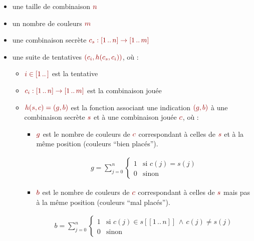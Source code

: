 \documentclass[a4paper]{article}
\newcommand{\isep}{\,..\,}
\renewcommand{\(}{\begin{math}\color{brick}}
\renewcommand{\)}{\end{math}}
\newcommand{\blockmath}[1]{{\color{brick}\begin{align*}#1\end{align*}}}
\newcommand{\lnd}{\,\land\,}
\begin{document}
\begin{itemize}
  
\item une taille de combinaison \(n\)
  
\item un nombre de couleurs \(m\)
  
\item une combinaison secrète \(c_s : [1 \isep n] \rightarrow [1 \isep m]\)
  
\item une suite de tentatives \((c_i, h(c_s,c_i))\), où :
  
  \begin{itemize}
    
  \item \(i \in [1 \isep ]\) est la tentative
    
  \item \(c_i : [1 \isep n] \rightarrow [1 \isep m]\) est la combinaison jouée
    
  \item \(h(s,c) = (g,b)\) est la fonction associant une indication \((g,b)\) à une combinaison secrète \(s\) et à une combinaison jouée \(c\), où :
    
    \begin{itemize}
      
    \item \(g\) est le nombre de couleurs de \(c\) correspondant
      à celles de \(s\) et à la même position (couleurs ``bien
      placés'').
      
      \blockmath{
        g = \sum_{j=0}^{n}
        \begin{cases}
          1 & \text{si } c(j)=s(j) \\
          0 & \text{sinon}
        \end{cases}
      }
      
    \item \(b\) est le nombre de couleurs de \(c\) correspondant
      à celles de \(s\) mais pas à la même position (couleurs ``mal
      placés'').
      
      \blockmath{
        b = \sum_{j=0}^{n}
        \begin{cases}
          1 & \text{si } c(j) \in s[[1 \isep n]] \lnd c(j) \neq s(j) \\
          0 & \text{sinon}
        \end{cases}
      }
      
    \end{itemize}
  \end{itemize}
\end{itemize}
\end{document}
